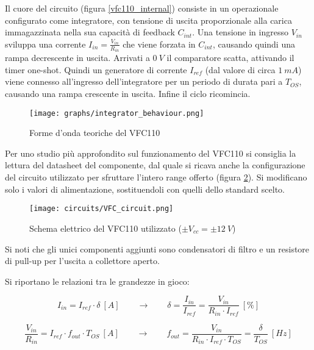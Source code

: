 Il cuore del circuito (figura \ref{vfc110_internal}) consiste in un operazionale configurato
come integratore, con tensione di uscita proporzionale alla carica immagazzinata nella sua
capacità di feedback $C_{int}$. Una tensione in ingresso $V_{in}$ sviluppa una corrente
$I_{in}=\frac{V_{in}}{R_{in}}$ che viene forzata in $C_{int}$, causando quindi una rampa
decrescente in uscita. Arrivati a $0\ V$ il comparatore scatta, attivando il timer one-shot.
Quindi un generatore di corrente $I_{ref}$ (dal valore di circa $1\ mA$) viene connesso
all'ingresso dell'integratore per un periodo di durata pari a $T_{OS}$, causando una rampa
crescente in uscita. Infine il ciclo ricomincia.

\begin{figure}[H]
    \centering
    \texttt{[image: graphs/integrator\_behaviour.png]}
    \caption{Forme d'onda teoriche del VFC110}
    \label{integrator_behaviour}
\end{figure}

Per uno studio più approfondito sul funzionamento del VFC110 si consiglia la lettura del
datasheet del componente, dal quale si ricava anche la configurazione del circuito utilizzato
per sfruttare l'intero range offerto (figura \ref{VFC_circuit}). Si modificano solo i valori
di alimentazione, sostituendoli con quelli dello standard scelto.

\begin{figure}[H]
    \centering
    \texttt{[image: circuits/VFC\_circuit.png]}
    \caption{Schema elettrico del VFC110 utilizzato ($\pm V_{cc}=\pm 12\ V$)}
    \label{VFC_circuit}
\end{figure}

Si noti che gli unici componenti aggiunti sono condensatori di filtro e un resistore di
pull-up per l'uscita a collettore aperto.

Si riportano le relazioni tra le grandezze in gioco:

\begin{equation}\label{duty_cycle}
    I_{in}=I_{ref}\cdot\delta\ [A]
    \qquad
    \rightarrow
    \qquad
    \delta=\frac{I_{in}}{I_{ref}}=\frac{V_{in}}{R_{in}\cdot I_{ref}}\ [\%]
\end{equation}

\begin{equation}\label{fout}
    \frac{V_{in}}{R_{in}}=I_{ref}\cdot f_{out}\cdot T_{OS}\ [A]
    \qquad
    \rightarrow
    \qquad
    f_{out}=\frac{V_{in}}{R_{in}\cdot I_{ref}\cdot T_{OS}}=\frac{\delta}{T_{OS}}\ [Hz]
\end{equation}

